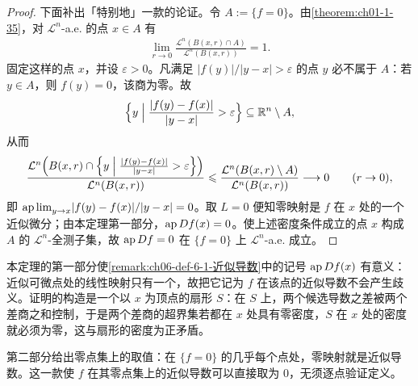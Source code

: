 \documentclass[../../main.tex]{subfiles}%
\begin{document}
\begin{proof}
下面补出「特别地」一款的论证。令 $A:=\{f=0\}$。由\cref{theorem:ch01-1-35}，对 $\mathcal{L}^n$-a.e. 的点 $x\in A$ 有%
\begin{align*}
\lim_{r\to0}\frac{\mathcal{L}^n(B(x,r)\cap A)}{\mathcal{L}^n(B(x,r))}=1 .
\end{align*}
固定这样的点 $x$，并设 $\varepsilon>0$。凡满足 $\lvert f(y)\rvert/\lvert y-x\rvert>\varepsilon$ 的点 $y$ 必不属于 $A$：若 $y\in A$，则 $f(y)=0$，该商为零。故
\begin{align*}
\Bigl\{y\Bigm|\frac{\lvert f(y)-f(x)\rvert}{\lvert y-x\rvert}>\varepsilon\Bigr\}\subseteq\mathbb{R}^n\setminus A,
\end{align*}
从而
\begin{align*}
\frac{\mathcal{L}^n\Bigl(B(x,r)\cap\Bigl\{y\Bigm|\frac{\lvert f(y)-f(x)\rvert}{\lvert y-x\rvert}>\varepsilon\Bigr\}\Bigr)}{\mathcal{L}^n(B(x,r))}\leqslant\frac{\mathcal{L}^n(B(x,r)\setminus A)}{\mathcal{L}^n(B(x,r))}\longrightarrow0\qquad(r\to0),
\end{align*}
即 $\operatorname*{ap\,lim}_{y\to x}\lvert f(y)-f(x)\rvert/\lvert y-x\rvert=0$。取 $L=0$ 便知零映射是 $f$ 在 $x$ 处的一个近似微分；由本定理第一部分，$\operatorname{ap} Df(x)=0$。使上述密度条件成立的点 $x$ 构成 $A$ 的 $\mathcal{L}^n$-全测子集，故 $\operatorname{ap} Df=0$ 在 $\{f=0\}$ 上 $\mathcal{L}^n$-a.e. 成立。
\end{proof}

\begin{remark}\label{remark:ch06-thm-6-3-动机}
本定理的第一部分使\cref{remark:ch06-def-6-1-近似导数}中的记号 $\operatorname{ap} Df(x)$ 有意义：近似可微点处的线性映射只有一个，故把它记为 $f$ 在该点的近似导数不会产生歧义。证明的构造是一个以 $x$ 为顶点的扇形 $S$：在 $S$ 上，两个候选导数之差被两个差商之和控制，于是两个差商的超界集若都在 $x$ 处具有零密度，$S$ 在 $x$ 处的密度就必须为零，这与扇形的密度为正矛盾。%

第二部分给出零点集上的取值：在 $\{f=0\}$ 的几乎每个点处，零映射就是近似导数。这一款使 $f$ 在其零点集上的近似导数可以直接取为 $0$，无须逐点验证定义。
\end{remark}
\end{document}
